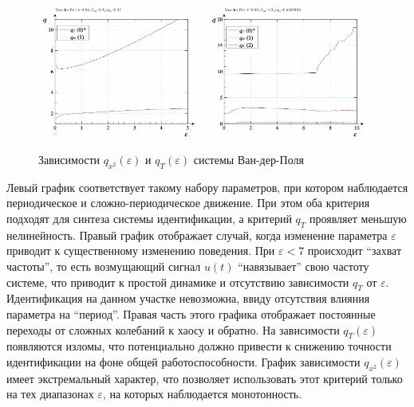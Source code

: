 \begin{figure}[ht!]
\begin{center}
  \includegraphics[width=0.49\textwidth]{p/cha/vdp/vdp_q-p_q_0x30_0x27.png}
  \hfill
  \includegraphics[width=0.49\textwidth]{p/cha/vdp/vdp_q-p_q_1x20_0x6283185.png}
\end{center}
  \caption{Зависимости $q_{x^2}(\varepsilon)$ и $q_T(\varepsilon) $ системы Ван-дер-Поля}
\label{atu:f:vdp_q1}
\end{figure}

Левый график соответствует такому набору параметров,
при котором наблюдается периодическое и сложно-периодическое движение.
При этом оба критерия подходят для синтеза системы идентификации, а
критерий $q_T$ проявляет меньшую нелинейность.
Правый график отображает случай, когда изменение параметра $\varepsilon$
приводит к существенному изменению поведения.
При $\varepsilon < 7 $ происходит ``захват частоты'',
то есть возмущающий сигнал $u(t)$ ``навязывает'' свою частоту системе,
что приводит к простой динамике и отсутствию зависимости $q_T$ от $\varepsilon$.
Идентификация на данном участке невозможна, ввиду
отсутствия влияния параметра на ``период''.
Правая часть этого графика отображает постоянные переходы от
сложных колебаний к хаосу и обратно. На зависимости $q_T(\varepsilon)$
появляются изломы, что потенциально должно привести к снижению
точности идентификации на фоне общей работоспособности.
График зависимости $q_{x^2}(\varepsilon)$ имеет экстремальный характер,
что позволяет использовать этот критерий только на тех диапазонах $\varepsilon$,
на которых наблюдается монотонность.

